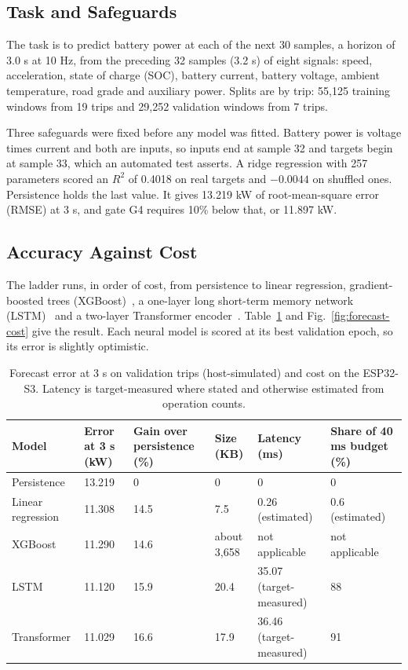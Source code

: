 \documentclass{ieeeaccess}
\begin{document}
\subsection{Task and Safeguards}

The task is to predict battery power at each of the next 30 samples, a horizon of 3.0 s at 10 Hz, from the preceding 32 samples (3.2 s) of eight signals: speed, acceleration, state of charge (SOC), battery current, battery voltage, ambient temperature, road grade and auxiliary power. Splits are by trip: 55,125 training windows from 19 trips and 29,252 validation windows from 7 trips.

Three safeguards were fixed before any model was fitted. Battery power is voltage times current and both are inputs, so inputs end at sample 32 and targets begin at sample 33, which an automated test asserts. A ridge regression with 257 parameters scored an $R^{2}$ of 0.4018 on real targets and $-0.0044$ on shuffled ones. Persistence holds the last value. It gives 13.219 kW of root-mean-square error (RMSE) at 3 s, and gate G4 requires 10\% below that, or 11.897 kW.

\subsection{Accuracy Against Cost}

The ladder runs, in order of cost, from persistence to linear regression, gradient-boosted trees (XGBoost)~\cite{chen2016}, a one-layer long short-term memory network (LSTM)~\cite{hochreiter1997} and a two-layer Transformer encoder~\cite{vaswani2017}. Table~\ref{tab:forecast-ladder} and Fig.~\ref{fig:forecast-cost} give the result. Each neural model is scored at its best validation epoch, so its error is slightly optimistic.

\begin{table}[!t]
\centering
\caption{Forecast error at 3 s on validation trips (host-simulated) and cost on the ESP32-S3. Latency is target-measured where stated and otherwise estimated from operation counts.}
\label{tab:forecast-ladder}
\footnotesize
\setlength{\tabcolsep}{3pt}
\renewcommand{\arraystretch}{1.15}
\begin{tabularx}{\textwidth}{@{}XXXXXX@{}}
\hline
\textbf{Model} & \textbf{Error at 3 s (kW)} & \textbf{Gain over persistence (\%)} & \textbf{Size (KB)} & \textbf{Latency (ms)} & \textbf{Share of 40 ms budget (\%)} \\
\hline
Persistence & 13.219 & 0 & 0 & 0 & 0 \\
Linear regression & 11.308 & 14.5 & 7.5 & 0.26 (estimated) & 0.6 (estimated) \\
XGBoost & 11.290 & 14.6 & about 3,658 & not applicable & not applicable \\
LSTM & 11.120 & 15.9 & 20.4 & 35.07 (target-measured) & 88 \\
Transformer & 11.029 & 16.6 & 17.9 & 36.46 (target-measured) & 91 \\
\hline
\end{tabularx}
\end{table}
\end{document}
